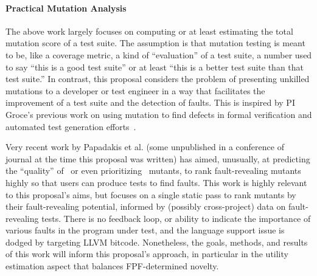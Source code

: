 \paragraph{Practical Mutation Analysis}
%
The above work largely focuses on computing or at least estimating the
total mutation score of a
test suite.  The assumption is that mutation testing is
meant to be, like a coverage metric, a kind of ``evaluation'' of a
test suite, a number used to say ``this is a good test suite'' or at
least ``this is a better test suite than that test suite.''  In contrast,
this proposal considers the problem of presenting unkilled mutations to
a developer or test engineer in a way that facilitates the improvement
of a test suite and the detection of faults.  This is inspired by PI Groce's
previous work on using mutation to find defects in formal verification
and automated test generation
efforts~\cite{groce2015verified,groce2018verified,mutKernel}.

Very recent work by Papadakis et al. (some unpublished in a conference
of journal at the time this proposal was written) has
aimed, unusually, at predicting the ``quality'' of~\cite{MutQuality}
or even prioritizing~\cite{FaRM} mutants, to rank fault-revealing
mutants highly so that users can produce tests to find faults.  This
work is highly relevant to this proposal's aims, but focuses on a single static
pass to rank mutants by their fault-revealing potential, informed by
(possibly cross-project)
data on fault-revealing tests.  There is no feedback loop, or ability
to indicate the importance of various faults in the program under
test, and the language support issue is dodged by targeting LLVM
bitcode.  Nonetheless, the goals, methods, and results of this work
will inform this proposal's approach, in particular in the utility estimation
aspect that balances FPF-determined novelty.

